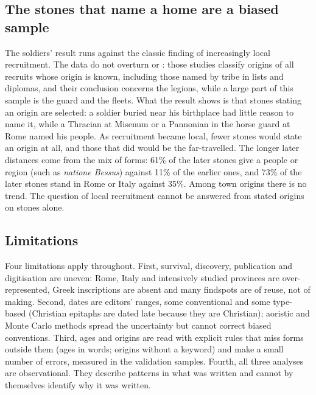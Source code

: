 \documentclass[11pt,a4paper]{article}
\begin{document}
\subsection{The stones that name a home are a biased sample}
The soldiers' result runs against the classic finding of increasingly local recruitment. The data do not overturn \citet{forni1953} or \citet{mann1983}: those studies classify origins of all recruits whose origin is known, including those named by tribe in lists and diplomas, and their conclusion concerns the legions, while a large part of this sample is the guard and the fleets. What the result shows is that stones stating an origin are selected: a soldier buried near his birthplace had little reason to name it, while a Thracian at Misenum or a Pannonian in the horse guard at Rome named his people. As recruitment became local, fewer stones would state an origin at all, and those that did would be the far-travelled. The longer later distances come from the mix of forms: 61\% of the later stones give a people or region (such as \textit{natione Bessus}) against 11\% of the earlier ones, and 73\% of the later stones stand in Rome or Italy against 35\%. Among town origins there is no trend. The question of local recruitment cannot be answered from stated origins on stones alone.

\subsection{Limitations}
Four limitations apply throughout. First, survival, discovery, publication and digitisation are uneven: Rome, Italy and intensively studied provinces are over-represented, Greek inscriptions are absent and many findspots are of reuse, not of making. Second, dates are editors' ranges, some conventional and some type-based (Christian epitaphs are dated late because they are Christian); aoristic and Monte Carlo methods spread the uncertainty but cannot correct biased conventions. Third, ages and origins are read with explicit rules that miss forms outside them (ages in words; origins without a keyword) and make a small number of errors, measured in the validation samples. Fourth, all three analyses are observational. They describe patterns in what was written and cannot by themselves identify why it was written.
\end{document}
